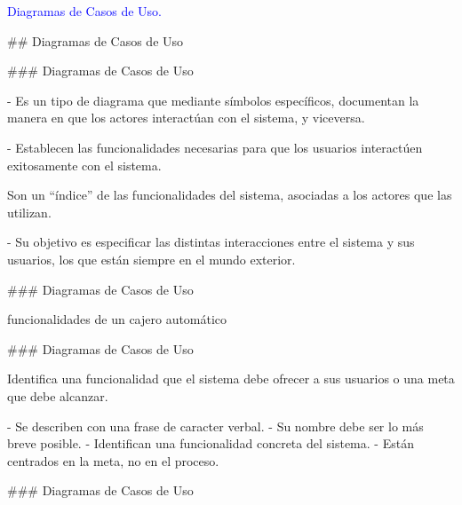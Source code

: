 \begin{rboxx}{}
    \textcolor{blue}{Diagramas de Casos de Uso.}
\end{rboxx}

## Diagramas de Casos de Uso

### Diagramas de Casos de Uso


- Es un tipo de diagrama que mediante símbolos específicos, documentan la manera en que los
actores interactúan con el sistema, y viceversa.

- Establecen las funcionalidades necesarias para que los usuarios interactúen exitosamente con el sistema.

\begin{rboxx}{}
    Son un ``índice'' de las funcionalidades del sistema,
    asociadas a los actores que las utilizan.
\end{rboxx}

- Su objetivo es especificar las distintas interacciones entre el sistema y sus usuarios, los que
están siempre en el mundo exterior.

### Diagramas de Casos de Uso

 funcionalidades de un cajero automático

\exA

### Diagramas de Casos de Uso


\columnsbegin


\centering{}

 Identifica una funcionalidad que el sistema
debe ofrecer a sus usuarios o una meta que debe alcanzar.\newline

\columnsend

- Se describen con una frase de caracter verbal.
- Su nombre debe ser lo más breve posible.
- Identifican una funcionalidad concreta del sistema.
- Están centrados en la meta, no en el proceso.


### Diagramas de Casos de Uso


\columnsbegin

